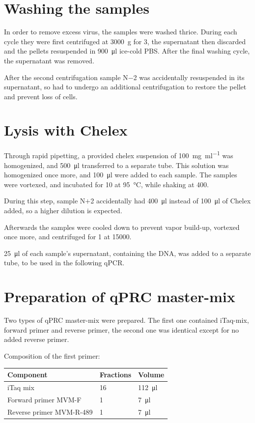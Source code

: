 \documentclass[a4paper,english]{scrreprt}
\begin{document}
\section{Washing the samples}

In order to remove excess virus, the samples were washed thrice. During each
cycle they were first centrifuged at \SI{3000}{g} for \SI{3}{\min}, the
supernatant then discarded and the pellets resuspended in \SI{900}{\ul} ice-cold
PBS. After the final washing cycle, the supernatant was removed.

After the second centrifugation sample N$-$2 was accidentally resuspended in
its supernatant, so had to undergo an additional centrifugation to restore the
pellet and prevent loss of cells.

\section{Lysis with Chelex}

Through rapid pipetting, a provided chelex suspension of \SI{100}{\mg \per \ml}
was homogenized, and \SI{500}{\ul} transferred to a separate tube. This
solution was homogenized once more, and \SI{100}{\ul} were added to each
sample. The samples were vortexed, and incubated for \SI{10}{\min} at
\SI{95}{\celsius}, while shaking at \SI{400}{\rpm}.

During this step, sample N$+$2 accidentally had \SI{400}{\ul} instead of
\SI{100}{\ul} of Chelex added, so a higher dilution is expected.

Afterwards the samples were cooled down to prevent vapor build-up, vortexed
once more, and centrifuged for \SI{1}{\min} at \SI{15000}{\rpm}.

\SI{25}{\ul} of each sample's supernatant, containing the DNA, was added to a
separate tube, to be used in the following qPCR.

\section{Preparation of qPRC master-mix}

Two types of qPRC master-mix were prepared. The first one contained iTaq-mix,
forward primer and reverse primer, the second one was identical except for no
added reverse primer.

Composition of the first primer:
\\

\begin{tabu}{lll}
	\toprule
	Component & Fractions & Volume \\
	\midrule
	iTaq mix & 16 & \SI{112}{\ul} \\
	Forward primer MVM-F & 1 & \SI{7}{\ul} \\
	Reverse primer MVM-R-489 & 1 & \SI{7}{\ul} \\
	\bottomrule
\end{tabu}
\\
\end{document}
